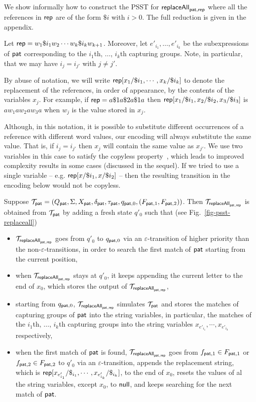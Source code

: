 We show informally how to construct the PSST for $\mathsf{replaceAll}_{\mathsf{pat}, \mathsf{rep}}$ where all the references in $\mathsf{rep}$ are of the form $\$i$ with $i > 0$.
The full reduction is given in the appendix.

Let $\mathsf{rep} = w_1 \$i_1 w_2 \cdots w_k \$i_k w_{k+1}$. Moreover, let $e'_{i_1},\ldots, e'_{i_k}$ be the subexpressions of $\mathsf{pat}$ corresponding to the $i_1$th, $\ldots$, $i_k$th capturing groups.
Note, in particular, that we may have $i_j = i_{j'}$ with $j \neq j'$.

By abuse of notation, we will write
$\mathsf{rep}[x_1/\$i_1,\cdots,x_k/\$i_k]$
to denote the replacement of the references, in order of appearance, by the contents of the variables $x_j$.
For example, if
$\mathsf{rep} = a \$1 a \$2 a \$1 a$
then
$\mathsf{rep}[x_1/\$i_1, x_2/\$i_2,x_3/\$i_3]$
is $a w_1 a w_2 a w_3 a$ when $w_j$ is the value stored in $x_j$.

Although, in this notation, it is possible to substitute different occurrences of a reference with different word values, our encoding will always substitute the same value.
That is, if $i_j = i_{j'}$ then $x_j$ will contain the same value as $x_{j'}$.
We use two variables in this case to satisfy the copyless property~\cite{AC10}, which leads to improved complexity results in some cases (discussed in the sequel).
If we tried to use a single variable – e.g. $\mathsf{rep}[x/\$i_1,x/\$i_2]$ – then the resulting transition in the encoding below would not be copyless.

 Suppose $\mathcal{T}_{\mathsf{pat}} = (Q_{\mathsf{pat}}, \Sigma, X_{\mathsf{pat}}, \delta_{\mathsf{pat}}, \tau_{\mathsf{pat}}, q_{\mathsf{pat},0}, (F_{\mathsf{pat},1}, F_{\mathsf{pat},2}))$.
Then $\mathcal{T}_{\mathsf{replaceAll}_{\mathsf{pat},\mathsf{rep}}}$ is obtained from $\mathcal{T}_{\mathsf{pat}}$ by adding a fresh state $q'_0$ such that (see Fig.~\ref{fig-psst-replaceall})
\begin{itemize}
    \item $\mathcal{T}_{\mathsf{replaceAll}_{\mathsf{pat},\mathsf{rep}}}$ goes from $q'_0$ to $q_{\mathsf{pat},0}$ via an $\varepsilon$-transition of higher priority than the non-$\varepsilon$-transitions, in order to search the first match of $\mathsf{pat}$ starting from the current position,
    \item when $\mathcal{T}_{\mathsf{replaceAll}_{\mathsf{pat},\mathsf{rep}}}$ stays at $q'_0$, it keeps appending the current letter to the end of $x_0$, which stores the output of $\mathcal{T}_{\mathsf{replaceAll}_{\mathsf{pat},\mathsf{rep}}}$,
    \item starting from $q_{\mathsf{pat}, 0}$, $\mathcal{T}_{\mathsf{replaceAll}_{\mathsf{pat},\mathsf{rep}}}$ simulates $\mathcal{T}_{\mathsf{pat}}$ and stores the matches of capturing groups of $\mathsf{pat}$ into the string variables, in particular,
    the matches of the $i_1$th, $\ldots$, $i_k$th capturing groups into the string variables $x_{e'_{i_1}}, \cdots, x_{e'_{i_k}}$ respectively,
    \item when the first match of $\mathsf{pat}$ is found, $\mathcal{T}_{\mathsf{replaceAll}_{\mathsf{pat},\mathsf{rep}}}$ goes from $f_{\mathsf{pat},1} \in F_{\mathsf{pat}, 1}$ or $f_{\mathsf{pat}, 2} \in F_{\mathsf{pat}, 2}$ to $q'_0$ via an $\varepsilon$-transition, appends the replacement string, which is $\mathsf{rep}[x_{e'_{i_1}}/\$_{i_1}, \cdots, x_{e'_{i_k}}/\$_{i_k}]$, to the end of $x_0$, resets the values of al the string variables, except $x_0$, to $\mathsf{null}$, and keeps searching for the next match of $\mathsf{pat}$.
\end{itemize}

